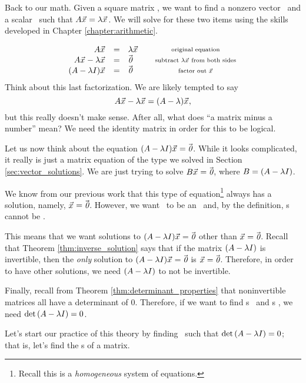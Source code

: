 Back to our math. Given a square matrix \tta, we want to find a nonzero vector \vx\ and a scalar \lda\ such that $A\vec{x_{}} = \lambda\vec{x_{}}$. We will solve for these two items using the skills developed in Chapter \ref{chapter:arithmetic}.

$$\begin{array}{rclcc}
\tta\vx & = & \lda\vx & &\parbox{100pt}{\centering\scriptsize original equation}\\
\tta\vx - \lda\vx & = & \zero & & \parbox{100pt}{\centering\scriptsize subtract $\lda\vx$ from both sides}\\
(\tta-\lda\tti)\vx & = & \zero & & \parbox{100pt}{\centering\scriptsize factor out \vx}\\
\end{array}$$
Think about this last factorization. We are likely tempted to say $$A\vec{x_{}}-\lambda\vec{x_{}} = (A-\lambda)\vec{x_{}},$$ but this really doesn't make sense. After all, what does ``a matrix minus a number'' mean? We need the identity matrix in order for this to be logical. 

Let us now think about the equation $(A-\lambda I)\vec{x_{}}=\vec{\text{\it 0}}$. While it looks complicated, it really is just a matrix equation of the type we solved in Section \ref{sec:vector_solutions}. We are just trying to solve $B\vec{x_{}}=\vec{\text{\it 0}}$, where $B = (A-\lambda I)$.

We know from our previous work that this type of equation\footnote{Recall this is a \textit{homogeneous} system of equations.} always has a solution, namely, $\vec{x_{}} = \vec{\text{\it 0}}$. However, we want \vx\ to be an \ev\ and, by the definition, \ev s cannot be \zero. 

This means that we want solutions to $(A-\lambda I)\vec{x_{}}=\vec{\text{\it 0}}$ other than $\vec{x_{}}=\vec{\text{\it 0}}$. Recall that Theorem \ref{thm:inverse_solution} says that if the matrix $(A-\lambda I)$ is invertible, then the \textit{only} solution to $(A-\lambda I)\vec{x_{}}=\vec{\text{\it 0}}$ is $\vec{x_{}}=\vec{\text{\it 0}}$. Therefore, in order to have other solutions, we need $(A-\lambda I)$ to not be invertible. 

Finally, recall from Theorem \ref{thm:determinant_properties} that noninvertible matrices all have a determinant of 0. Therefore, if we want to find \el s \lda\ and \ev s \vx, we need $\text{det}\left(A-\lambda I\right) = 0$.

Let's start our practice of this theory by finding \lda\ such that $\text{det}\left(A-\lambda I\right) = 0$; that is, let's find the \el s of a matrix.\\

